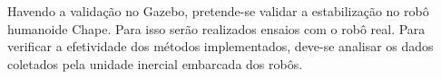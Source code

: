 Havendo a validação no Gazebo, pretende-se validar a estabilização no robô humanoide Chape. Para isso serão realizados ensaios com o robô real. Para verificar a efetividade dos métodos implementados, deve-se analisar os dados coletados pela unidade inercial embarcada dos robôs.


\newpage



\printbibliography

